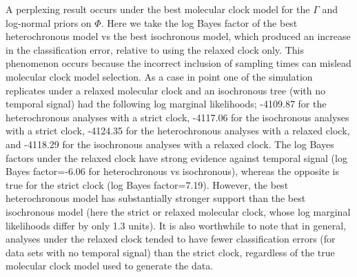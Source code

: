 \documentclass[10pt,letterpaper]{article}
\begin{document}
A perplexing result occurs under the best molecular clock model for the $\Gamma$ and log-normal priors on $\Phi$. Here we take the log Bayes factor of the best heterochronous model vs the best isochronous model, which produced an increase in the classification error, relative to using the relaxed clock only. This phenomenon occurs because the incorrect inclusion of sampling times can mislead molecular clock model selection. As a case in point one of the simulation replicates under a relaxed molecular clock and an isochronous tree (with no temporal signal) had the following log marginal likelihoods; -4109.87 for the heterochronous analyses with a strict clock, -4117.06 for the isochronous analyses with a strict clock, -4124.35 for the heterochronous analyses with a relaxed clock, and -4118.29 for the isochronous analyses with a relaxed clock. The log Bayes factors under the relaxed clock have strong evidence against temporal signal (log Bayes factor=-6.06 for heterochronous vs isochronous), whereas the opposite is true for the strict clock (log Bayes factor=7.19). However, the best heterochronous model has substantially stronger support than the best isochronous model (here the strict or relaxed molecular clock, whose log marginal likelihoods differ by only 1.3 units). It is also worthwhile to note that in general, analyses under the relaxed clock tended to have fewer classification errors (for data sets with no temporal signal) than the strict clock, regardless of the true molecular clock model used to generate the data.
\end{document}
